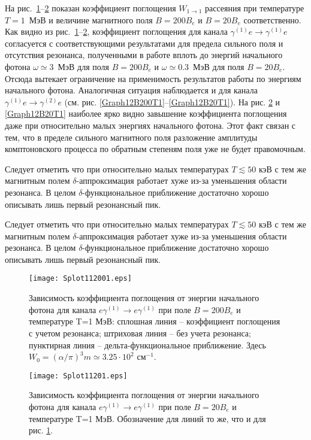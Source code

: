 На рис.~\ref{Graph11B200T1}--\ref{Graph11B20T1} показан  коэффициент поглощения $W_{1\to1}$ рассеяния при температуре $T=1 $~МэВ и величине магнитного поля $B=200B_e$ и $B=20B_e$ соответственно. Как видно из рис.~\ref{Graph11B200T1}--\ref{Graph11B20T1}, коэффициент поглощения для канала $\gamma^{(1)}e\to\gamma^{(1)}e$ согласуется с соответствующими результатами для предела сильного поля и отсутствия резонанса, полученными в работе \cite{Chistyakov:2009} вплоть до энергий начального фотона  $\omega\simeq3$~МэВ для поля $B=200B_e$ и  $\omega\simeq0.3$~МэВ для поля $B=20B_e$. Отсюда вытекает ограничение на применимость результатов работы \cite{Chistyakov:2009} по энергиям начального фотона. Аналогичная ситуация наблюдается и для канала $\gamma^{(1)}e\to\gamma^{(2)}e$ (см. рис. \ref{Graph12B200T1}--\ref{Graph12B20T1}).  На рис. \ref{Graph11B20T1} и \ref{Graph12B20T1} наиболее ярко видно завышение коэффициента поглощения даже при относительно малых энергиях начального фотона. Этот факт связан с тем, что в пределе сильного магнитного поля разложение амплитуды комптоновского процесса по обратным степеням поля уже не будет правомочным.  

Следует отметить   что при относительно малых температурах $T\lesssim50$ кэВ с тем же магнитным полем $\delta$-аппроксимация работает хуже из-за уменьшения области резонанса. В целом $\delta$-функциональное приближение достаточно хорошо описывать лишь первый резонансный пик.

Следует отметить   что при относительно малых температурах $T\lesssim50$ кэВ с тем же магнитным полем $\delta$-аппроксимация работает хуже из-за уменьшения области резонанса. В целом $\delta$-функциональное приближение достаточно хорошо описывать лишь первый резонансный пик.
\clearpage
\begin{figure}[t!]\centering
	\texttt{[image: Splot112001.eps]}
	\caption{Зависимость коэффициента поглощения от энергии начального фотона для канала $e\gamma^{(1)}\to e\gamma^{(1)}$ при поле $B=200 B_e$ и температуре T=1 МэВ: сплошная линия -- коэффициент поглощения с учетом резонанса; штриховая линия -- без учета резонанса; пунктирная линия -- дельта-функциональное приближение. Здесь $W_0=(\alpha/\pi)^3m\simeq 3.25\cdot10^2$ см$^{-1}$.}
	\label{Graph11B200T1}
\end{figure}

\begin{figure}[t!]\centering
	\texttt{[image: Splot11201.eps]}
	\caption{Зависимость коэффициента поглощения от энергии начального фотона для канала $e\gamma^{(1)}\to e\gamma^{(1)}$ при поле $B=20 B_e$ и температуре T=1 МэВ. Обозначение для линий то же, что и для рис. \ref{Graph11B200T1}.}
	\label{Graph11B20T1}
\end{figure}

